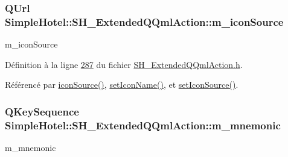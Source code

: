 \hypertarget{classSimpleHotel_1_1SH__ExtendedQQmlAction_a35a70eacc9b4d0873bd11d50aee5511f}{
\subsubsection[{m\-\_\-icon\-Source}]{\setlength{\rightskip}{0pt plus 5cm}Q\-Url Simple\-Hotel\-::\-S\-H\-\_\-\-Extended\-Q\-Qml\-Action\-::m\-\_\-icon\-Source\hspace{0.3cm}{\ttfamily [private]}}}\label{classSimpleHotel_1_1SH__ExtendedQQmlAction_a35a70eacc9b4d0873bd11d50aee5511f}


m\-\_\-icon\-Source 



Définition à la ligne \hyperlink{SH__ExtendedQQmlAction_8h_source_l00287}{287} du fichier \hyperlink{SH__ExtendedQQmlAction_8h_source}{S\-H\-\_\-\-Extended\-Q\-Qml\-Action.\-h}.



Référencé par \hyperlink{classSimpleHotel_1_1SH__ExtendedQQmlAction_a1ce7f4befe1cac01245c9cb393f1e4ac}{icon\-Source()}, \hyperlink{classSimpleHotel_1_1SH__ExtendedQQmlAction_ae989680dffcc6e86e5ff686136d787a3}{set\-Icon\-Name()}, et \hyperlink{classSimpleHotel_1_1SH__ExtendedQQmlAction_af81c3330e02238f5cbfe5d5b287695ab}{set\-Icon\-Source()}.

\hypertarget{classSimpleHotel_1_1SH__ExtendedQQmlAction_aef951bbe65264f4e650e98b4449fbe48}{
\subsubsection[{m\-\_\-mnemonic}]{\setlength{\rightskip}{0pt plus 5cm}Q\-Key\-Sequence Simple\-Hotel\-::\-S\-H\-\_\-\-Extended\-Q\-Qml\-Action\-::m\-\_\-mnemonic\hspace{0.3cm}{\ttfamily [private]}}}\label{classSimpleHotel_1_1SH__ExtendedQQmlAction_aef951bbe65264f4e650e98b4449fbe48}


m\-\_\-mnemonic 



